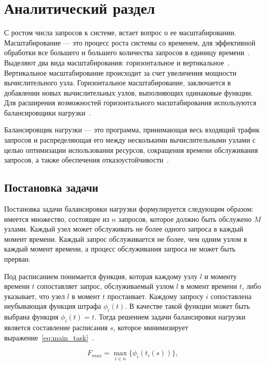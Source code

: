 

\chapter{Аналитический раздел}

С ростом числа запросов к системе, встает вопрос о ее масштабировании. 
Масштабирование --- это процесс роста системы со временем, для эффективной обработки все большего и большего количества запросов в единицу времени~\cite{scaling}. 
Выделяют два вида масштабирования: горизонтальное и вертикальное~\mbox{\cite{comp, part_algos, com_analysis}}.
Вертикальное масштабирование происходит за счет увеличения мощности вычислительного узла.  
Горизонтальное масштабирование, заключается в добавлении новых вычислительных узлов, выполняющих одинаковые функции.
Для расширения возможностей горизонтального масштабирования используются балансировщики нагрузки~\cite{part_algos, comp}.

Балансировщик нагрузки --- это программа, принимающая весь
входящий трафик запросов и распределяющая его между несколькими
вычислительными узлами с целью оптимизации использования
ресурсов, сокращения времени обслуживания запросов, а также
обеспечения отказоустойчивости~\cite{comp}.


\section{Постановка задачи}

Постановка задачи балансировки нагрузки формулируется следующим образом: имеется множество, состоящее из $n$ запросов, которое должно быть обслужено $M$ узлами. 
Каждый узел может обслуживать не более одного запроса в каждый момент времени.
Каждый запрос обслуживается не более, чем одним узлом в каждый момент времени, а процесс обслуживания запроса не может быть прерван. 

Под расписанием понимается функция, которая каждому узлу $l$ и моменту времени $t$ сопоставляет запрос, обслуживаемый узлом $l$ в момент времени $t$, либо указывает, что узел $l$ в момент $t$ простаивает.
Каждому запросу $i$ сопоставлена неубывающая функция штрафа $\phi_i(t)$. В качестве такой функции может быть выбрана функция $\phi_i(t) = t$.
Тогда решением задачи балансировки нагрузки является составление расписания $s$, которое минимизирует выражение~\eqref{eq:main_task}~\cite{gaud}.

\begin{equation}
	\label{eq:main_task}	
	F_{max} =   \max_{i \in n} \{\phi_i(t_i(s))\}, 
\end{equation}

